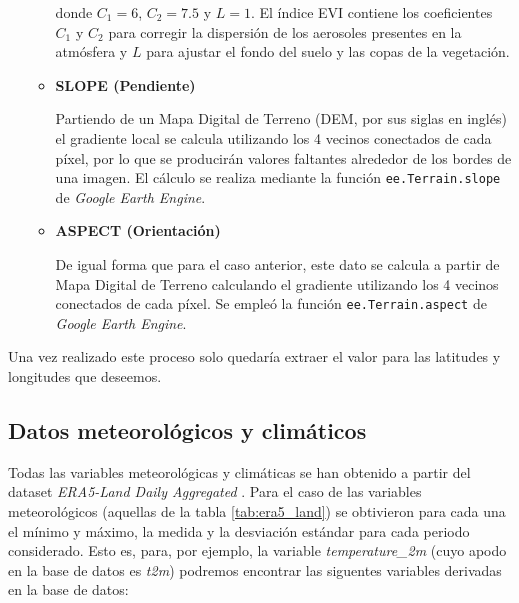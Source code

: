\begin{itemize}
\begin{itemize}
        donde \(C_1 = 6\), \(C_2 = 7.5\) y \(L = 1\). El índice EVI contiene los coeficientes \(C_1\) y \(C_2\) para corregir la dispersión de los aerosoles presentes en la atmósfera y \(L\) para ajustar el fondo del suelo y las copas de la vegetación.
    
        \item \textbf{SLOPE (Pendiente)} \cite{ee_terrain_slope}
        
        Partiendo de un Mapa Digital de Terreno (DEM, por sus siglas en inglés) el gradiente local se calcula utilizando los 4 vecinos conectados de cada píxel, por lo que se producirán valores faltantes alrededor de los bordes de una imagen. El cálculo se realiza mediante la función \texttt{ee.Terrain.slope} de \textit{Google Earth Engine}.
    
        \item \textbf{ASPECT (Orientación)} \cite{ee_terrain_slope}
        
        De igual forma que para el caso anterior, este dato se calcula a partir de Mapa Digital de Terreno calculando el gradiente utilizando los 4 vecinos conectados de cada píxel. Se empleó la función \texttt{ee.Terrain.aspect} de \textit{Google Earth Engine}.
    \end{itemize}
\end{itemize}

Una vez realizado este proceso solo quedaría extraer el valor para las latitudes y longitudes que deseemos. 

\subsection{Datos meteorológicos y climáticos}

Todas las variables meteorológicas y climáticas se han obtenido a partir del dataset \textit{ERA5-Land Daily Aggregated} \cite{copernicus_era5_land_daily}. Para el caso de las variables meteorológicos (aquellas de la tabla \ref{tab:era5_land}) se obtivieron para cada una el mínimo y máximo, la medida y la desviación estándar para cada periodo considerado. Esto es, para, por ejemplo, la variable \textit{temperature\_2m} (cuyo apodo en la base de datos es \textit{t2m}) podremos encontrar las siguentes variables derivadas en la base de datos:

